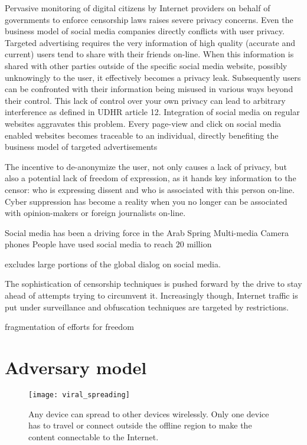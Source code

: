 Pervasive monitoring of digital citizens by Internet providers on behalf of governments to enforce censorship laws raises severe privacy concerns.
Even the business model of social media companies directly conflicts with user privacy.
Targeted advertising requires the very information of high quality (accurate and current) users tend to share with their friends on-line.
When this information is shared with other parties outside of the specific social media website, possibly unknowingly to the user, it effectively becomes a privacy leak.
Subsequently users can be confronted with their information being misused in various ways beyond their control.
This lack of control over your own privacy can lead to arbitrary interference as defined in UDHR article 12. %
Integration of social media on regular websites aggravates this problem.
Every page-view and click on social media enabled websites becomes traceable to an individual, directly benefiting the business model of targeted advertisements

The incentive to de-anonymize the user, not only causes a lack of privacy, but also a potential lack of freedom of expression, as it hands key information to the censor: who is expressing dissent and who is associated with this person on-line.
Cyber suppression has become a reality when you no longer can be associated with opinion-makers or foreign journalists on-line.

Social media has been a driving force in the Arab Spring 
Multi-media 
Camera phones
People have used social media to reach 20 million 


 excludes large portions of the global dialog on social media.




The sophistication of censorship techniques is pushed forward by the drive to stay ahead of attempts trying to circumvent it.
Increasingly though, Internet traffic is put under surveillance and obfuscation techniques are targeted by restrictions.


fragmentation of efforts for freedom


\section{Adversary model}
\pagebreak

\begin{figure}[h]
	\centering
	\texttt{[image: viral\_spreading]}
	\caption{Any device can spread to other devices wirelessly.
		Only one device has to travel or connect outside the offline region to make the content connectable to the Internet.}
	\label{fig:viral_spreading}
\end{figure}



